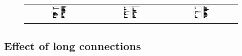 \documentclass[12pt]{article}
\begin{document}
\begin{figure}[!htb]
\begin{tabular}{ccc}
     \includegraphics[width=0.3\textwidth]{fig/ccf/ccf7} & \includegraphics[width=0.3\textwidth]{fig/ccf/ccf8} & \includegraphics[width=0.3\textwidth]{fig/ccf/ccf9} 
 \end{tabular}
\end{figure}

\FloatBarrier
\clearpage
\subsection*{Effect of long connections}
\end{document}
